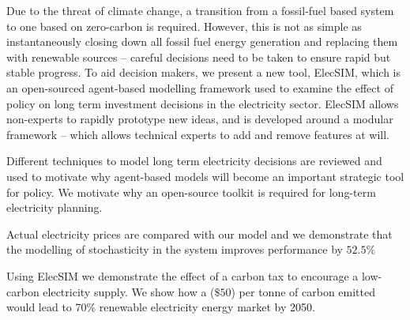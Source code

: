 Due to the threat of climate change, a transition from a fossil-fuel based system to one based on zero-carbon is required. However, this is not as simple as instantaneously closing down all fossil fuel energy generation and replacing them with renewable sources -- careful decisions need to be taken to ensure rapid but stable progress. To aid decision makers, we present a new tool, ElecSIM, which is an open-sourced agent-based modelling framework used to examine the effect of policy on long term investment decisions in the electricity sector. ElecSIM allows non-experts to rapidly prototype new ideas, and is developed around a modular framework -- which allows technical experts to add and remove features at will. 

Different techniques to model long term electricity decisions are reviewed and used to motivate why agent-based models will become an important strategic tool for policy. We motivate why an open-source toolkit is required for long-term electricity planning.

Actual electricity prices are compared with our model and we demonstrate that the modelling of stochasticity in the system improves performance by $52.5\%$

Using ElecSIM we demonstrate the effect of a carbon tax to encourage a low-carbon electricity supply. We show how a  ($\$50$) per tonne of carbon emitted would lead to 70\% renewable electricity energy market by 2050. 
